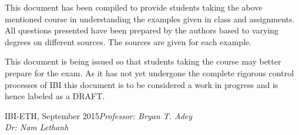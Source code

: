 \foreword
This document has been compiled to provide students taking the above mentioned course in understanding the examples given in class and assignments. All questions presented have been prepared by the authors based to varying degrees on different sources. The sources are given for each example.

This document is being issued so that students taking the course may better prepare for the exam. As it has not yet undergone the complete rigorous control processes of IBI this document is to be considered a work in progress and is hence labeled as a DRAFT.


\vspace{\baselineskip}
\begin{flushright}\noindent
IBI-ETH, September 2015\hfill {\it Professor: Bryan T. Adey}\\
\hfill {\it Dr: Nam Lethanh}\\
\end{flushright}


